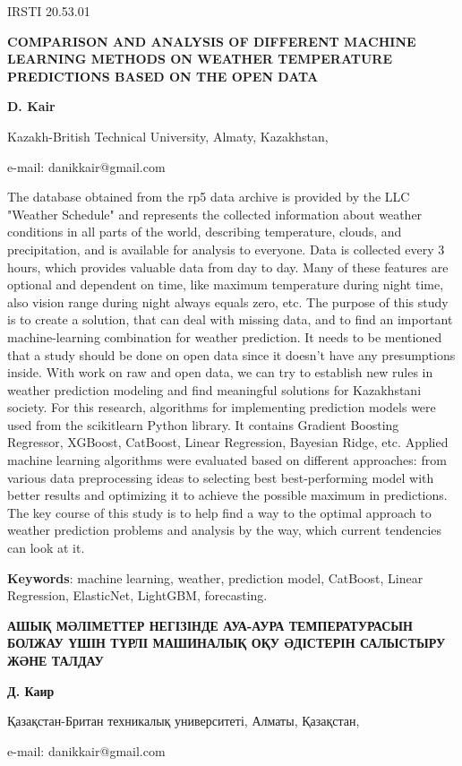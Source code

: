 IRSTI 20.53.01

\textbf{COMPARISON AND ANALYSIS OF DIFFERENT MACHINE LEARNING METHODS ON
WEATHER TEMPERATURE PREDICTIONS BASED ON THE OPEN DATA}

\textbf{D. Kair}

Kazakh-British Technical University, Almaty, Kazakhstan,

e-mail: danikkair@gmail.com

The database obtained from the rp5 data archive is provided by the LLC
"Weather Schedule" and represents the collected information about
weather conditions in all parts of the world, describing temperature,
clouds, and precipitation, and is available for analysis to everyone.
Data is collected every 3 hours, which provides valuable data from day
to day. Many of these features are optional and dependent on time, like
maximum temperature during night time, also vision range during night
always equals zero, etc. The purpose of this study is to create a
solution, that can deal with missing data, and to find an important
machine-learning combination for weather prediction. It needs to be
mentioned that a study should be done on open data since it doesn't have
any presumptions inside. With work on raw and open data, we can try to
establish new rules in weather prediction modeling and find meaningful
solutions for Kazakhstani society. For this research, algorithms for
implementing prediction models were used from the scikitlearn Python
library. It contains Gradient Boosting Regressor, XGBoost, CatBoost,
Linear Regression, Bayesian Ridge, etc. Applied machine learning
algorithms were evaluated based on different approaches: from various
data preprocessing ideas to selecting best best-performing model with
better results and optimizing it to achieve the possible maximum in
predictions. The key course of this study is to help find a way to the
optimal approach to weather prediction problems and analysis by the way,
which current tendencies can look at it.

\textbf{Keywords}: machine learning, weather, prediction model,
CatBoost, Linear Regression, ElasticNet, LightGBM, forecasting.

\textbf{АШЫҚ МӘЛІМЕТТЕР НЕГІЗІНДЕ АУА-АУРА ТЕМПЕРАТУРАСЫН БОЛЖАУ ҮШІН
ТҮРЛІ МАШИНАЛЫҚ ОҚУ ӘДІСТЕРІН САЛЫСТЫРУ ЖӘНЕ ТАЛДАУ}

\textbf{Д. Каир}

Қазақстан-Британ техникалық университеті, Алматы, Қазақстан,

e-mail: danikkair@gmail.com

